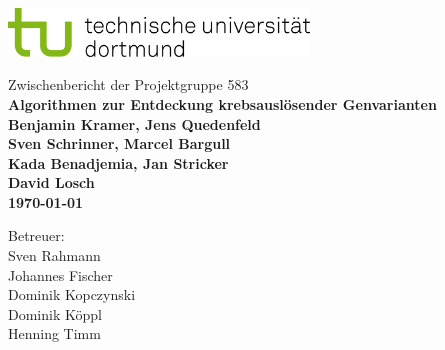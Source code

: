 \begin{titlepage}
\vspace*{-2cm}
\newlength{\links}
\setlength{\links}{-1.5cm}
\sf
\LARGE

\hspace*{\links}
\begin{minipage}{12.5cm}
\includegraphics[width=8cm]{bilder/tud_logo_rgb}
\end{minipage}

\vspace*{4cm}

\hspace*{\links}
\hspace*{-0.2cm}
\begin{minipage}{9cm}
\large
\begin{center}
{\Large Zwischenbericht der Projektgruppe 583} \\
\vspace*{1cm}
\bf{ Algorithmen zur Entdeckung krebsauslösender Genvarianten } \\
\vspace*{1.5cm}
Benjamin Kramer, Jens Quedenfeld\\
Sven Schrinner, Marcel Bargull \\
Kada Benadjemia, Jan Stricker \\
David Losch\\
\today
\end{center}
\end{minipage}

\vspace*{1.5cm}

\hspace*{\links}

\vspace*{1.5cm}

\vspace*{.6cm}

\hspace*{\links}
\begin{minipage}[b]{5cm}
\normalsize
\raggedright
Betreuer: \\
Sven Rahmann\\
Johannes Fischer\\
Dominik Kopczynski \\
Dominik Köppl\\
Henning Timm
\end{minipage}


\end{titlepage}
